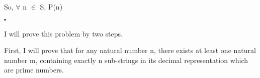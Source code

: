 \documentclass[12pt]{article}
\renewcommand{\_}{\kern-1.5pt\textunderscore\kern-1.5pt}
\begin{document}
\begin{enumerate}
\begin{enumerate}
\tab \tab {}\par

\tab \tab {}\par

\par

\tab \tab {}\par

\tab \tab {}\par

\tab \tab {}\par

\tab \tab {}\par

{\fontsize{14pt}{16.8pt}\selectfont \tab So, $ \forall $  n $ \in $  S, P(n)\par}\par

\begin{FlushRight}
{\fontsize{14pt}{16.8pt}\selectfont $\centerdot$ \par}
\end{FlushRight}\par


\vspace{\baselineskip}

\vspace{\baselineskip}
\begin{FlushLeft}
{\fontsize{14pt}{16.8pt}\selectfont I will prove this problem by two steps. \par}
\end{FlushLeft}\par


\vspace{\baselineskip}
\begin{FlushLeft}
{\fontsize{14pt}{16.8pt}\selectfont First, I will prove that for any natural number n, there exists at least one natural number m, containing exactly n sub-strings in its decimal representation which are prime numbers.\par}
\end{FlushLeft}\par



\end{enumerate}
\end{enumerate}
\end{document}
